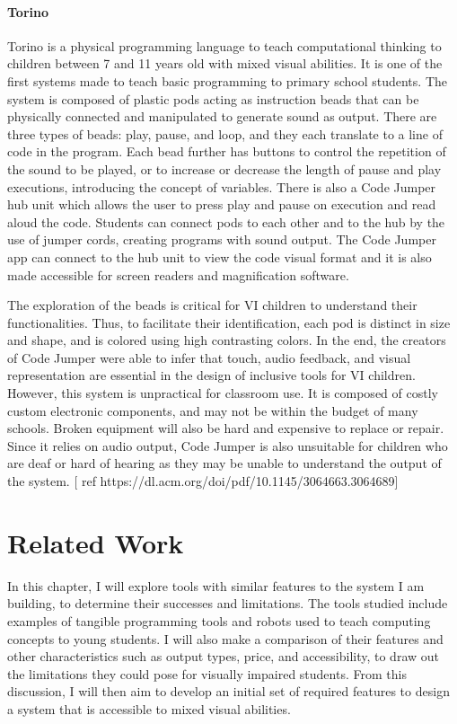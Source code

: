 \documentclass[oneside,%
                    author={Malak Hajji},
                    degree={BSc},
                    title={Designing An Accessible Computational Toolkit For Students},
                  subtitle={With Mixed Visual Abilities}]{dissertation}
\begin{document}
\subsubsection{Torino}
Torino is a physical programming language to teach computational thinking to children between 7 and 11 years old with mixed visual abilities. It is one of the first systems made to teach basic programming to primary school students. The system is composed of plastic pods acting as instruction beads that can be physically connected and manipulated to generate sound as output. There are three types of beads: play, pause, and loop, and they each translate to a line of code in the program. Each bead further has buttons to control the repetition of the sound to be played, or to increase or decrease the length of pause and play executions, introducing the concept of variables. There is also a Code Jumper hub unit which allows the user to press play and pause on execution and read aloud the code. Students can connect pods to each other and to the hub by the use of jumper cords, creating programs with sound output. The Code Jumper app can connect to the hub unit to view the code visual format and it is also made accessible for screen readers and magnification software.  

The exploration of the beads is  critical for VI children to understand their functionalities. Thus, to facilitate their identification, each pod is distinct in size and shape, and is colored using high contrasting colors. In the end, the creators of Code Jumper were able to infer that touch, audio feedback, and visual representation are essential in the design of inclusive tools for VI children.
However, this system is unpractical for classroom use. It is composed of costly custom electronic components, and may not be within the budget of many schools. Broken equipment will also be hard and expensive to replace or repair. Since it relies on audio output, Code Jumper is also unsuitable for children who are deaf or hard of hearing as they may be unable to understand the output of the system. [ ref https://dl.acm.org/doi/pdf/10.1145/3064663.3064689]




\chapter{Related Work}
\label{chap:execution}
In this chapter, I will explore tools with similar features to the system I am building, to determine their successes and limitations. The tools studied include examples of tangible programming tools and robots used to teach computing concepts to young students. I will also make a comparison of their features and other characteristics such as output types, price, and accessibility, to draw out the limitations they could pose for visually impaired students. From this discussion, I will then aim to develop an initial set of required features to design a system that is accessible to mixed visual abilities.
\end{document}
